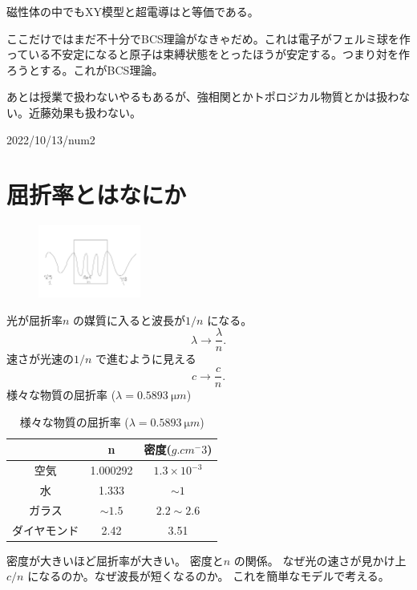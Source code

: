 \documentclass[dvipdfmx]{jsarticle}
\begin{document}
磁性体の中でもXY模型と超電導はと等価である。

ここだけではまだ不十分でBCS理論がなきゃだめ。これは電子がフェルミ球を作っている不安定になると原子は束縛状態をとったほうが安定する。つまり対を作ろうとする。これがBCS理論。

あとは授業で扱わないやるもあるが、強相関とかトポロジカル物質とかは扱わない。近藤効果も扱わない。


2022/10/13/num2
\section{屈折率とはなにか}

\begin{figure}[H]
	\centering
	\includegraphics[width=0.3\textwidth]{fig2/Fig-2.jpg}
	\label{fig:fig2-Fig-2-jpg}
\end{figure}
光が屈折率$n$ の媒質に入ると波長が$1 /n$ になる。
\[
\lambda\to \frac{\lambda}{n}
.\] 
速さが光速の$1 /n$ で進むように見える
\[
c\to \frac{c}{n}
.\] 
様々な物質の屈折率 ($\lambda=\SI{0.5893}{\micro m}$)
\begin{table}[H]
	\centering
	\caption{様々な物質の屈折率 ($\lambda=\SI{0.5893}{\micro m}$)}
	\label{tab:2-1}
	\begin{tabular}{ccc}\hline
	 &n &密度($\si{g.cm^-3}$)\\ \hline
	空気&1.000292&$1.3\times 10^{-3}$\\
	水&1.333&$\sim 1$\\
	ガラス&$\sim 1.5$&$2.2\sim 2.6$\\
	ダイヤモンド&2.42&3.51\\ \hline
	\end{tabular}
\end{table}
密度が大きいほど屈折率が大きい。
密度と$n$ の関係。
なぜ光の速さが見かけ上$c /n$ になるのか。なぜ波長が短くなるのか。
これを簡単なモデルで考える。
\end{document}

